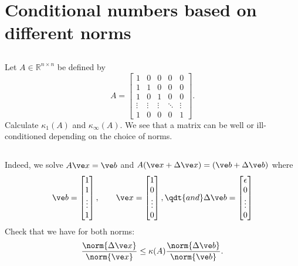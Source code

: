 \documentclass[11pt,letterpaper]{article}
\begin{document}
\section{Conditional numbers based on different norms}
\subsection{}
Let $A \in \mathbb{R}^{n\times n}$ be defined by
\begin{equation*}
    A = %
    \begin{bmatrix}
      1      & 0      & 0      & 0      &  0      \\ 
      1      & 1      & 0      & 0      &  0      \\
      1      & 0      & 1      & 0      &  0      \\
      \vdots & \vdots & \vdots & \ddots &  \vdots \\
      1      & 0      & 0      & 0      &  1
    \end{bmatrix}.
\end{equation*}
Calculate $\kappa_1(A)$ and $\kappa_\infty(A)$. We see that a matrix can be well or ill-conditioned depending on the choice of norms.

\subsection{}
Indeed, we solve $A\ve x = \ve b$ and $A(\ve x+\Delta \ve x) = (\ve b+\Delta \ve b)$ where
\begin{align*}
    \ve b = \begin{bmatrix}
    1\\1\\\vdots\\1
    \end{bmatrix},\qquad \ve x = \begin{bmatrix}
    1\\0\\\vdots\\0
    \end{bmatrix},\qdt{and} \Delta\ve b = \begin{bmatrix}
    \epsilon\\0\\\vdots\\0
    \end{bmatrix}
\end{align*}
Check that we have for both norms:
\begin{align*}
    \frac{\norm{\Delta\ve x}}{\norm{\ve x}} \leq \kappa(A)\frac{\norm{\Delta\ve b}}{\norm{\ve b}}.
\end{align*}
\end{document}
